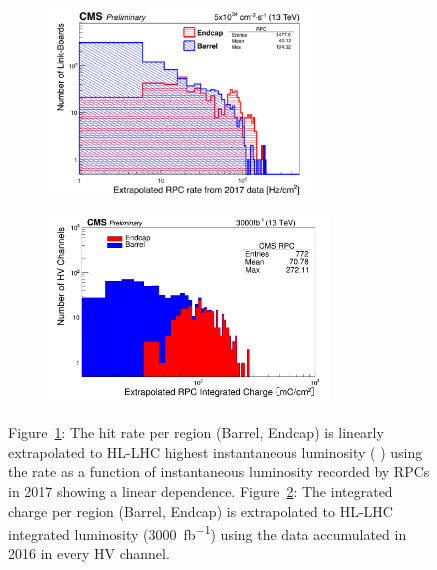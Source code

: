 	\begin{figure}[H]
		\begin{subfigure}{0.5\linewidth}
			\centering
			\includegraphics[height=5cm]{fig/chapt5/RPC-Rate-HL-LHC_2017.png}
			\caption{\label{fig:RPC-HL-LHC:A}}
		\end{subfigure}
		\begin{subfigure}{0.5\linewidth}
			\centering
			\includegraphics[height=5cm]{fig/chapt5/RPC-IC-HL-LHC_2016.png}
			\caption{\label{fig:RPC-HL-LHC:B}}
		\end{subfigure}
		\caption{\label{fig:RPC-HL-LHC} Figure~\ref{fig:RPC-HL-LHC:A}: The hit rate per region (Barrel, Endcap) is linearly extrapolated to HL-LHC highest instantaneous luminosity ( \siflux) using the rate as a function of instantaneous luminosity recorded by RPCs in 2017 showing a linear dependence. Figure~\ref{fig:RPC-HL-LHC:B}: The integrated charge per region (Barrel, Endcap) is extrapolated to HL-LHC integrated luminosity (\SI{3000}{fb^{-1}}) using the data accumulated in 2016 in every HV channel.}
	\end{figure}
    
